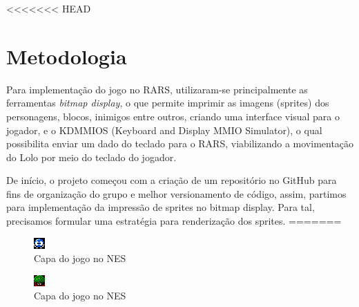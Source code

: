 \documentclass[10pt, conference, compsocconf]{IEEEtran}
\begin{document}
<<<<<<< HEAD
\section{Metodologia}
\label{sec:Metodologia}

Para implementação do jogo no RARS, utilizaram-se principalmente as ferramentas
\textit{bitmap display}, o que permite imprimir as imagens (sprites) dos personagens,
blocos, inimigos entre outros, criando uma interface visual para o jogador, e o
KDMMIOS (Keyboard and Display MMIO Simulator), o qual possibilita enviar um dado
do teclado para o RARS, viabilizando a movimentação do Lolo por meio do teclado
do jogador.

De início, o projeto começou com a criação de um repositório no GitHub para fins
de organização do grupo e melhor versionamento de código, assim, partimos para
implementação da impressão de sprites no bitmap display. Para tal, precisamos
formular uma estratégia para renderização dos sprites.
=======
\begin{figure}[htb]
  \begin{center}
   \includegraphics[width=0.3\linewidth]{./Figures/image_3.png}
  \end{center}
  \caption{Capa do jogo no NES}
  \label{fig:01}
\end{figure}

\begin{figure}[htb]
  \begin{center}
   \includegraphics[width=0.3\linewidth]{./Figures/image_4.png}
  \end{center}
  \caption{Capa do jogo no NES}
  \label{fig:01}
\end{figure}
\end{document}
